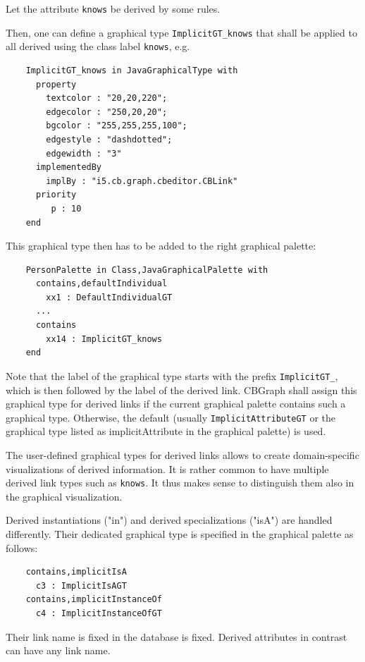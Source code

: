 Let the attribute {\tt knows} be derived by some rules. 

Then, one can define a graphical type {\tt ImplicitGT\_knows} that shall be applied to
all derived using the class label {\tt knows}, e.g.

{\small
\begin{verbatim}
    ImplicitGT_knows in JavaGraphicalType with  
      property
        textcolor : "20,20,220";
        edgecolor : "250,20,20";
        bgcolor : "255,255,255,100";
        edgestyle : "dashdotted";
        edgewidth : "3"
      implementedBy
        implBy : "i5.cb.graph.cbeditor.CBLink"
      priority
         p : 10
    end 
\end{verbatim}
}


This graphical type then has to be added to the right graphical palette:

{\small
\begin{verbatim}
    PersonPalette in Class,JavaGraphicalPalette with  
      contains,defaultIndividual
        xx1 : DefaultIndividualGT
      ...
      contains
        xx14 : ImplicitGT_knows
    end
\end{verbatim}
}


Note that the label of the graphical type starts with the prefix {\tt ImplicitGT\_}, which is then followed
by the label of the derived link.
CBGraph shall assign this graphical type for derived links if the current graphical palette contains
such a graphical type.
Otherwise, the default (usually {\tt ImplicitAttributeGT} or the graphical type listed as implicitAttribute in the
graphical palette) is used.

The user-defined graphical types for derived links allows to create domain-specific visualizations of derived
information. It is rather common to have multiple derived link types such as {\tt knows}. It thus makes sense
to distinguish them also in the graphical visualization.

Derived instantiations ("in") and derived specializations ("isA") are handled differently. Their dedicated graphical type
is specified in the graphical palette as follows:

{\small
\begin{verbatim}
    contains,implicitIsA
      c3 : ImplicitIsAGT
    contains,implicitInstanceOf
      c4 : ImplicitInstanceOfGT
\end{verbatim}
}


Their link name is fixed in the database is fixed. Derived attributes in contrast can have any link name.






